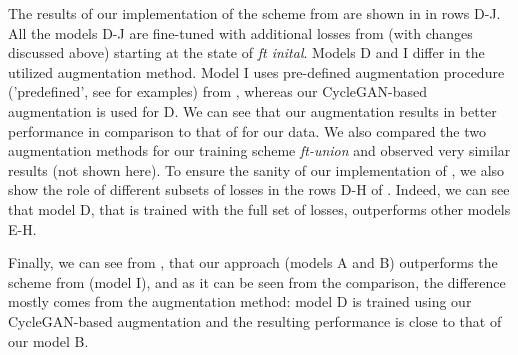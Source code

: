 The results of our implementation of the scheme from \citep{SohnLZY0C17} are shown in  in rows D-J. All the models D-J are fine-tuned with additional losses from \citep{SohnLZY0C17} (with changes discussed above) starting at the state of \textit{ft inital}. Models D and I differ in the utilized augmentation method. Model I uses pre-defined augmentation procedure ('predefined', see  for examples) from \citep{SohnLZY0C17}, whereas our CycleGAN-based augmentation is used for D.  We can see that our augmentation results in better performance in comparison to that of \citep{SohnLZY0C17} for our data. We also compared the two augmentation methods for our training scheme \textit{ft-union} and observed very similar results (not shown here).
 To ensure the sanity of our implementation of \citep{SohnLZY0C17}, we also show the role of different subsets of losses in the rows D-H of . Indeed, we can see that model D, that is trained with the full set of losses, outperforms other models E-H. 

Finally, we can see from , that our approach (models A and B) outperforms the scheme from \citep{SohnLZY0C17} (model I), and as it can be seen from the comparison, the difference mostly comes from the augmentation method: model D is trained using our CycleGAN-based augmentation and the resulting performance is close to that of our model B.
 



